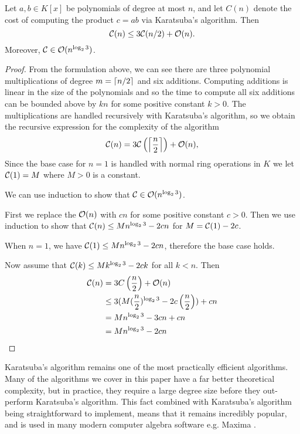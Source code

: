 \begin{theorem}
    
    Let $a, b \in K[x]$ be polynomials of degree at most $n$, and let $C(n)$ denote the cost of computing the product $c = ab$ via Karatsuba's algorithm. Then 
    \[
        \mathcal C(n) \le 3\mathcal C(n/2) + \mathcal O(n).
    \]
    Moreover, $\mathcal C \in \mathcal O(n^{\log_2 3})$.
\end{theorem}

\begin{proof}
    From the formulation above, we can see there are three polynomial multiplications of degree $m = \left \lceil n/2 \right \rceil$ and six additions. Computing additions is linear in the size of the polynomials and so the time to compute all six additions can be bounded above by $kn$ for some positive constant $k > 0$. The multiplications are handled recursively with Karatsuba's algorithm, so we obtain the recursive expression for the complexity of the algorithm
    \[
        \mathcal C(n) = 3\mathcal C\left(\left \lceil \frac{n}{2} \right \rceil\right) + \mathcal O(n),
    \]
    Since the base case for $n = 1$ is handled with normal ring operations in $K$ we let $\mathcal C(1) = M$ where $M > 0$ is a constant.

    We can use induction to show that $\mathcal C \in \mathcal O(n^{\log_2 3})$.

    First we replace the $\mathcal O(n)$ with $cn$ for some positive constant $c > 0$. Then we use induction to show that $\mathcal C(n) \le Mn^{\log_2 3} - 2cn$ for $M = \mathcal C(1) - 2c$.

    When $n = 1$, we have $\mathcal C(1) \le Mn^{\log_2 3} - 2cn$, therefore the base case holds.

    Now assume that $\mathcal C(k) \le Mk^{\log_2 3} - 2ck$ for all $k < n$. Then 
    \begin{align*}
        \mathcal C(n) &= 3C\left(\frac{n}{2}\right) + \mathcal O(n)\\
                 &\le 3(M(\frac{n}{2})^{\log_2 3} - 2c\left(\frac{n}{2}\right)) + cn\\
                 &= Mn^{\log_2 3} - 3cn + cn\\
                 &= Mn^{\log_2 3} - 2cn
    \end{align*}
\end{proof}

\medskip

Karatsuba's algorithm remains one of the most practically efficient algorithms. Many of the algorithms we cover in this paper have a far better theoretical complexity, but in practice, they require a large degree size before they out-perform Karatsuba's algorithm. This fact combined with Karatsuba's algorithm being straightforward to implement, means that it remains incredibly popular, and is used in many modern computer algebra software e.g. Maxima \cite{maxima-karatsuba}.

